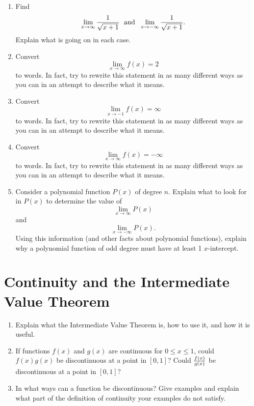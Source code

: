 \begin{enumerate}
\item  Find $$\mathop {\lim }\limits_{x \to \infty } {1 \over {\sqrt {x + 1} }}\ \ {\rm{and}} \ \ \mathop {\lim }\limits_{x \to  - \infty } {1 \over {\sqrt {x + 1} }}.$$  Explain what is going on in each case. 

\item  Convert $$\mathop {\lim }\limits_{x \to \infty } f(x) = 2$$ to words.  In fact, try to rewrite this statement in as many different ways as you can in an attempt to describe what it means. 

\item  Convert $$\mathop {\lim }\limits_{x \to  - 1} f(x) = \infty $$ to words.  In fact, try to rewrite this statement in as many different ways as you can in an attempt to describe what it means. 

\item  Convert $$\mathop {\lim }\limits_{x \to \infty } f(x) =  - \infty $$ to words.  In fact, try to rewrite this statement in as many different ways as you can in an attempt to describe what it means. 

\item  Consider a polynomial function $P(x)$ of degree $n$.  Explain what to look for in $P(x)$ to determine the value of $$\mathop {\lim }\limits_{x \to \infty } P(x)$$ and $$\mathop {\lim }\limits_{x \to  - \infty } P(x).$$  Using this information (and other facts about polynomial functions), explain why a polynomial function of odd degree must have at least 1 $x$-intercept. 

\end{enumerate}\section{Continuity and the Intermediate Value Theorem} \begin{enumerate} 

\item  Explain what the Intermediate Value Theorem is, how to use it, and how it is useful. 

\item  If functions $f(x)$ and $g(x)$ are continuous for $ 0 \le x \le 1 $, could $ f(x)g(x) $ be discontinuous at a point in $ \left[0, 1\right]$?  Could $ {{f(x)} \over {g(x)}} $ be discontinuous at a point in $ \left[0, 1\right] $?  \cite{FWG} 

\item  In what ways can a function be discontinuous?  Give examples and explain what part of the definition of continuity your examples do not satisfy. 


\end{enumerate}

